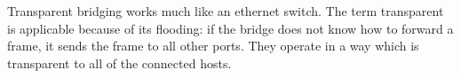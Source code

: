 Transparent bridging works much like an ethernet switch. The term transparent is applicable because of its flooding: if the bridge does not know how to forward a frame, it sends the frame to all other ports. They operate in a way which is transparent to all of the connected hosts.